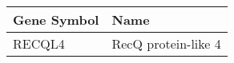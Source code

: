 \begin{tabular}{ll}
\toprule
Gene Symbol &                Name \\
\midrule
     RECQL4 & RecQ protein-like 4 \\
\bottomrule
\end{tabular}
